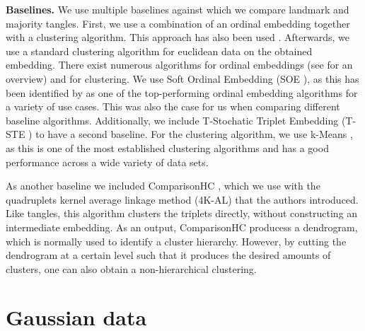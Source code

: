 \noindent
\textbf{Baselines.}
We use multiple baselines against which we compare landmark and majority tangles.
First, we use a combination of an ordinal embedding together with a clustering algorithm. This approach has also been used \cite{kleindessnerLensDepthFunction2017}. 
Afterwards, we use a standard clustering algorithm for euclidean data on the obtained embedding.  
There exist numerous algorithms for ordinal embeddings (see \cite{vankadaraInsightsOrdinalEmbedding2021} for an overview) and for clustering.  
We use Soft Ordinal Embedding (SOE \cite{teradaLocalOrdinalEmbedding2014}), as this has been identified by \cite{vankadaraInsightsOrdinalEmbedding2021} as one of the 
top-performing ordinal embedding algorithms for a variety of use cases. This was also the case for us when comparing different baseline algorithms.
Additionally, we include T-Stochatic Triplet Embedding (T-STE \cite{laurensvandermaatenStochasticTripletEmbedding2012}) 
to have a second baseline. For the clustering algorithm, we use k-Means \citep{lloydLeastSquaresQuantization1982}, as this is one of the most established clustering algorithms 
and has a good performance across a wide variety of data sets.

As another baseline we included ComparisonHC \citep{ghoshdastidarFoundationsComparisonBasedHierarchical2019}, which we use with the quadruplets kernel average linkage method (4K-AL) 
that the authors introduced.
Like tangles, this algorithm clusters the triplets directly, without constructing an intermediate embedding.
As an output, ComparisonHC producess a dendrogram, which is normally used to identify a cluster hierarchy. However, by cutting the dendrogram at a certain level such that it produces the desired 
amounts of clusters, one can also obtain a non-hierarchical clustering. \\

\section{Gaussian data}\label{sec:gaussian_data}
